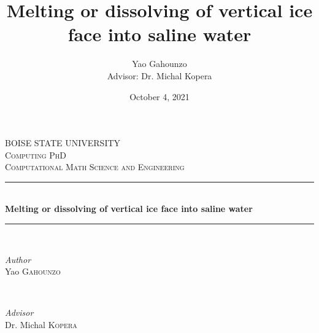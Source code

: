 \documentclass[11pt,a4paper]{article}
\title{Melting or dissolving of vertical ice face into saline water}
\author{Yao Gahounzo\\[1cm]{\small Advisor: Dr. Michal Kopera}}
\date{October 4, 2021}
\begin{document}
	
	
	\begin{titlepage} %
	\newcommand{\HRule}{\rule{\linewidth}{0.5mm}} %
	
	\center %
	
	
	\textsc{\LARGE BOISE STATE UNIVERSITY}\\[1.5cm] %
	
	\textsc{\Large Computing PhD}\\[0.5cm] %
	
	\textsc{\large Computational Math Science and Engineering}\\[2cm] %
	
	
	\HRule\\[0.4cm]
	
	{\huge\bfseries Melting or dissolving of vertical ice face into saline water}\\[0.4cm] %
	
	\HRule\\[1.5cm]
	
	
	\begin{minipage}{0.4\textwidth}
		\begin{flushleft}
			\large
			\textit{Author}\\
			Yao \textsc{Gahounzo} %
		\end{flushleft}
	\end{minipage}
	~
	\begin{minipage}{0.4\textwidth}
		\begin{flushright}
			\large
			\textit{Advisor}\\
			Dr. Michal \textsc{Kopera} %
		\end{flushright}
	\end{minipage}
	

\end{titlepage}
\end{document}
